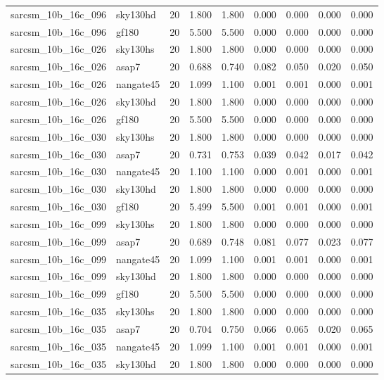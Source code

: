 \begin{tabular}{llrrrrrrr}
sarcsm\_10b\_16c\_096 & sky130hd & 20 & 1.800 & 1.800 & 0.000 & 0.000 & 0.000 & 0.000 \\
sarcsm\_10b\_16c\_096 & gf180 & 20 & 5.500 & 5.500 & 0.000 & 0.000 & 0.000 & 0.000 \\
sarcsm\_10b\_16c\_026 & sky130hs & 20 & 1.800 & 1.800 & 0.000 & 0.000 & 0.000 & 0.000 \\
sarcsm\_10b\_16c\_026 & asap7 & 20 & 0.688 & 0.740 & 0.082 & 0.050 & 0.020 & 0.050 \\
sarcsm\_10b\_16c\_026 & nangate45 & 20 & 1.099 & 1.100 & 0.001 & 0.001 & 0.000 & 0.001 \\
sarcsm\_10b\_16c\_026 & sky130hd & 20 & 1.800 & 1.800 & 0.000 & 0.000 & 0.000 & 0.000 \\
sarcsm\_10b\_16c\_026 & gf180 & 20 & 5.500 & 5.500 & 0.000 & 0.000 & 0.000 & 0.000 \\
sarcsm\_10b\_16c\_030 & sky130hs & 20 & 1.800 & 1.800 & 0.000 & 0.000 & 0.000 & 0.000 \\
sarcsm\_10b\_16c\_030 & asap7 & 20 & 0.731 & 0.753 & 0.039 & 0.042 & 0.017 & 0.042 \\
sarcsm\_10b\_16c\_030 & nangate45 & 20 & 1.100 & 1.100 & 0.000 & 0.001 & 0.000 & 0.001 \\
sarcsm\_10b\_16c\_030 & sky130hd & 20 & 1.800 & 1.800 & 0.000 & 0.000 & 0.000 & 0.000 \\
sarcsm\_10b\_16c\_030 & gf180 & 20 & 5.499 & 5.500 & 0.001 & 0.001 & 0.000 & 0.001 \\
sarcsm\_10b\_16c\_099 & sky130hs & 20 & 1.800 & 1.800 & 0.000 & 0.000 & 0.000 & 0.000 \\
sarcsm\_10b\_16c\_099 & asap7 & 20 & 0.689 & 0.748 & 0.081 & 0.077 & 0.023 & 0.077 \\
sarcsm\_10b\_16c\_099 & nangate45 & 20 & 1.099 & 1.100 & 0.001 & 0.001 & 0.000 & 0.001 \\
sarcsm\_10b\_16c\_099 & sky130hd & 20 & 1.800 & 1.800 & 0.000 & 0.000 & 0.000 & 0.000 \\
sarcsm\_10b\_16c\_099 & gf180 & 20 & 5.500 & 5.500 & 0.000 & 0.000 & 0.000 & 0.000 \\
sarcsm\_10b\_16c\_035 & sky130hs & 20 & 1.800 & 1.800 & 0.000 & 0.000 & 0.000 & 0.000 \\
sarcsm\_10b\_16c\_035 & asap7 & 20 & 0.704 & 0.750 & 0.066 & 0.065 & 0.020 & 0.065 \\
sarcsm\_10b\_16c\_035 & nangate45 & 20 & 1.099 & 1.100 & 0.001 & 0.001 & 0.000 & 0.001 \\
sarcsm\_10b\_16c\_035 & sky130hd & 20 & 1.800 & 1.800 & 0.000 & 0.000 & 0.000 & 0.000 \\

\end{tabular}
